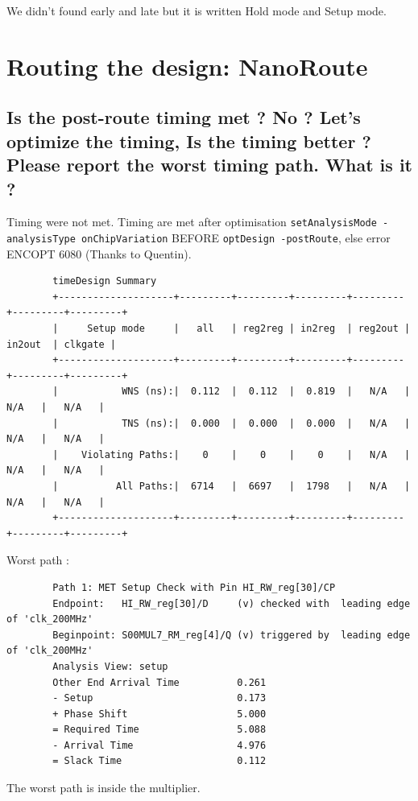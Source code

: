 \documentclass[11pt,a4paper,sans,dvipsnames]{report}
\begin{document}
	We didn't found early and late but it is written Hold mode and Setup mode.




	\newpage
	\section{Routing the design: NanoRoute}

	\subsection*{Is the post-route timing met ? No ? Let's optimize the timing, Is the timing better ? Please report the worst timing path. What is it ?}
	Timing were not met. Timing are met after optimisation
	\texttt{setAnalysisMode -analysisType onChipVariation} BEFORE \texttt{optDesign -postRoute}, else error ENCOPT 6080 (Thanks to Quentin).

	\begin{lstlisting}
		timeDesign Summary                             
		+--------------------+---------+---------+---------+---------+---------+---------+
		|     Setup mode     |   all   | reg2reg | in2reg  | reg2out | in2out  | clkgate |
		+--------------------+---------+---------+---------+---------+---------+---------+
		|           WNS (ns):|  0.112  |  0.112  |  0.819  |   N/A   |   N/A   |   N/A   |
		|           TNS (ns):|  0.000  |  0.000  |  0.000  |   N/A   |   N/A   |   N/A   |
		|    Violating Paths:|    0    |    0    |    0    |   N/A   |   N/A   |   N/A   |
		|          All Paths:|  6714   |  6697   |  1798   |   N/A   |   N/A   |   N/A   |
		+--------------------+---------+---------+---------+---------+---------+---------+
	\end{lstlisting}

	Worst path :

	\begin{lstlisting}
		Path 1: MET Setup Check with Pin HI_RW_reg[30]/CP 
		Endpoint:   HI_RW_reg[30]/D     (v) checked with  leading edge of 'clk_200MHz'
		Beginpoint: S00MUL7_RM_reg[4]/Q (v) triggered by  leading edge of 'clk_200MHz'
		Analysis View: setup
		Other End Arrival Time          0.261
		- Setup                         0.173
		+ Phase Shift                   5.000
		= Required Time                 5.088
		- Arrival Time                  4.976
		= Slack Time                    0.112
	\end{lstlisting}

	The worst path is inside the multiplier.
\end{document}
